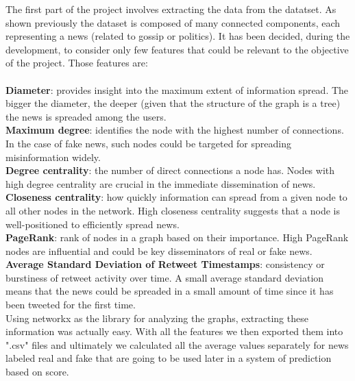 \documentclass[11pt,a4paper]{article}
\begin{document}
The first part of the project involves extracting the data from the datatset. As shown previously the dataset is composed of many connected components, each representing a news (related to gossip or politics). It has been decided, during the development, to consider only few features that could be relevant to the objective of the project.
Those features are:\\\\
\textbf{Diameter}: provides insight into the maximum extent of information spread. The bigger the diameter, the deeper (given that the structure of the graph is a tree) the news is spreaded among the users.\\
\textbf{Maximum degree}: identifies the node with the highest number of connections. In the case of fake news, such nodes could be targeted for spreading misinformation widely.\\
\textbf{Degree centrality}: the number of direct connections a node has. Nodes with high degree centrality are crucial in the immediate dissemination of news.\\
\textbf{Closeness centrality}: how quickly information can spread from a given node to all other nodes in the network. High closeness centrality suggests that a node is well-positioned to efficiently spread news.\\
\textbf{PageRank}: rank of nodes in a graph based on their importance. High PageRank nodes are influential and could be key disseminators of real or fake news.\\
\textbf{Average Standard Deviation of Retweet Timestamps}: consistency or burstiness of retweet activity over time. A small average standard deviation means that the news could be spreaded in a small amount of time since it has been tweeted for the first time.\\

Using networkx as the library for analyzing the graphs, extracting these information was actually easy. With all the features we then exported them into ".csv" files and ultimately we calculated all the average values separately for news labeled real and fake that are going to be used later in a system of prediction based on score.
\end{document}
